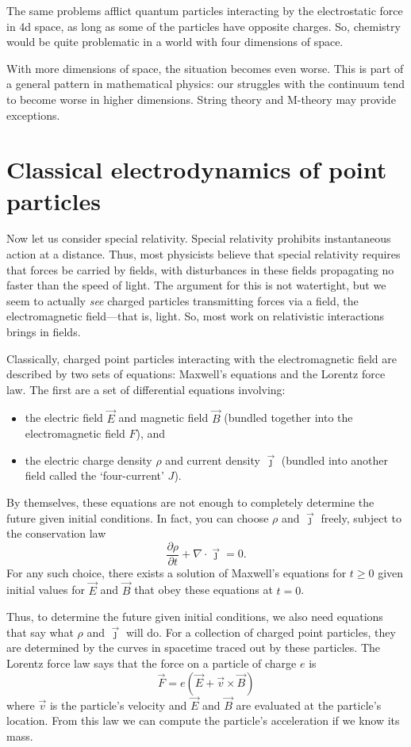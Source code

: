 \documentclass[12pt]{article}
\begin{document}
The same problems afflict quantum particles interacting by the electrostatic force in 4d space, as long as some of the particles have opposite charges.   So, chemistry would be quite problematic in a world with four dimensions of space.  

With more dimensions of space, the situation becomes even worse.  This is part of a general pattern in mathematical physics: our struggles with the continuum tend to become worse in higher dimensions.  String theory and M-theory may provide exceptions.

\section{Classical electrodynamics of point particles}
\label{electrodynamics}

Now let us consider special relativity.  Special relativity prohibits instantaneous action at a distance.  Thus, most physicists believe that special relativity requires that forces be carried by fields, with disturbances in these fields propagating no faster than the speed of light.  The argument for this is not watertight, but we seem to actually \emph{see} charged particles transmitting forces via a field, the electromagnetic field---that is, light.  So, most work on relativistic interactions brings in fields.

Classically, charged point particles interacting with the electromagnetic field are described by two sets of equations: Maxwell's equations and the Lorentz force law.  The first are a set of differential equations involving:
\begin{itemize}
\item the electric field $\vec E$ and magnetic field $\vec B$ (bundled together into the electromagnetic field $F$), and
\item the electric charge density $\rho$ and current density $\vec \jmath$ (bundled into another field called the `four-current' $J$). 
\end{itemize}
By themselves, these equations are not enough to completely determine the future given initial conditions.  In fact, you can choose $\rho$ and $\vec \jmath$ freely, subject
to the conservation law
\[   \frac{\partial \rho}{\partial t} + \nabla \cdot \vec \jmath = 0. \]
For any such choice, there exists a solution of Maxwell's equations for $t \ge 0$ given initial values for $\vec E$ and $\vec B$ that obey these equations at $t = 0$.  

Thus, to determine the future given initial conditions, we also need equations that say what $\rho$ and $\vec{\jmath}$ will do.  For a collection of charged point particles, they are determined by the curves in spacetime traced out by these particles.  The Lorentz force law says that the force on a particle of charge $e$ is
\[           \vec{F} = e (\vec{E} + \vec{v} \times \vec{B})  \]
where $\vec v$ is the particle's velocity and $\vec{E}$ and $\vec{B}$ are evaluated
at the particle's location.  From this law we can compute the particle's acceleration if we know its mass.   
\end{document}
